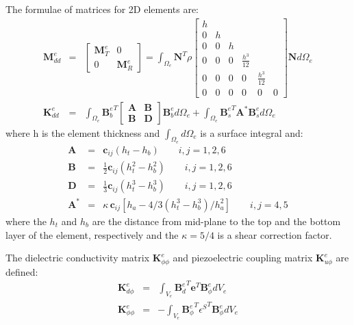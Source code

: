 \documentclass[materials,article,submit,moreauthors,pdftex]{Definitions/mdpi}
\begin{document}
{The formulae of matrices for 2D elements are:
\begin{eqnarray}
\textbf{M}_{dd}^e & = &
\left [
\begin{array}{cc}
\textbf{M}_T^e & 0\\
0 & \textbf{M}_R^e
\end{array}
\right] =
\int_{\Omega_e}\textbf{N}^T\rho 
\left [
\begin{array}{cccccc}
h &  & &  &  &\\
0 & h & & & &\\
0 & 0 & h & & & \\
0 & 0 & 0 & \frac{h^3}{12} & &\\
0 & 0 & 0 & 0 & \frac{h^3}{12} &\\
0 & 0 & 0 & 0 & 0 & 0
\end{array} \right]
\textbf{N} d\Omega_e\\
\textbf{K}_{dd}^e & = & \int_{\Omega_e}{\textbf{B}_b^e}^T
\left[
\begin{array}{cc}
\textbf{A} & \textbf{B}\\
\textbf{B} & \textbf{D}
\end{array} \right]
\textbf{B}_b^ed \Omega_e+\int_{\Omega_e}{\textbf{B}_s^e}^T\textbf{A}^{\ast}\textbf{B}_s^ed \Omega_e
\end{eqnarray}
where h is the element thickness and \(\int_{\Omega_e}d\Omega_e\) is a surface integral and:
\begin{eqnarray}
\textbf{A} & = & \textbf{c}_{ij}(h_t-h_b)\qquad i,j=1,2,6\nonumber\\
\textbf{B} & = & \frac{1}{2}\textbf{c}_{ij}(h_t^2-h_b^2)\qquad i,j=1,2,6\nonumber\\
\textbf{D} & = & \frac{1}{3}\textbf{c}_{ij}(h_t^3-h_b^3)\qquad i,j=1,2,6\nonumber\\
\textbf{A}^{\ast} & = & \kappa \, \textbf{c}_{ij}\left[h_a-4/3\left(h_t^3-h_b^3\right)/h_a^2\right]\qquad i,j=4,5\nonumber
\end{eqnarray}
where the \(h_t\) and \(h_b\) are the distance from mid-plane to the top and the bottom layer of the element, respectively and the \(\kappa=5/4\) is a shear correction factor.

The dielectric conductivity matrix \(\textbf{K}_{\phi \phi}^e\) and piezoelectric coupling matrix \(\textbf{K}_{u \phi}^e\) are defined:
\begin{eqnarray}
\textbf{K}_{d\phi}^e & = & \int_{V_e}{\textbf{B}_d^e}^T\textbf{e}^T \textbf{B}_{\phi}^ed V_e\\
\textbf{K}_{\phi \phi}^e & = & -\int_{V_e}{\textbf{B}_{\phi}^e}^T 
{\textbf{\(\epsilon\)}^S}^T \textbf{B}_{\phi}^edV_e
\end{eqnarray}

}
\end{document}

